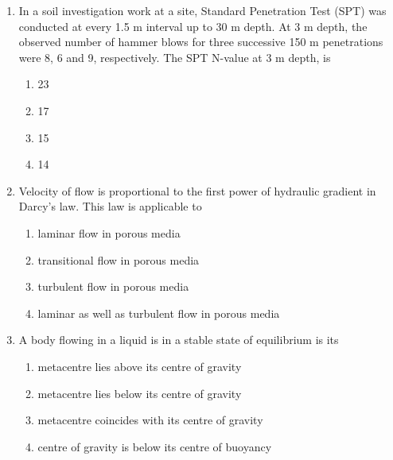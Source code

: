 \documentclass[journal]{IEEEtran}
\begin{document}
\begin{enumerate}
\item In a soil investigation work at a site, Standard Penetration Test (SPT) was conducted at every 1.5 m  interval up to 30 m depth. At 3 m depth, the observed number of hammer blows for three successive 150 m penetrations were 8, 6 and 9, respectively. The SPT N-value at 3 m depth, is
\begin{multicols}{2}
    \begin{enumerate}
        \item 23
        \item 17
        \item 15
        \item 14
    \end{enumerate}
\end{multicols}

\item Velocity of flow is proportional to the first power of hydraulic gradient in Darcy's law. This law is applicable to
\begin{multicols}{2}
    \begin{enumerate}
        \item laminar flow in porous media
        \item transitional flow in porous media
        \item turbulent flow in porous media
        \item laminar as well as turbulent flow in porous media
    \end{enumerate}
\end{multicols}

\item A body flowing in a liquid is in a stable state of equilibrium is its
\begin{multicols}{2}
    \begin{enumerate}
        \item metacentre lies above its centre of gravity
        \item metacentre lies below its centre of gravity
        \item metacentre coincides with its centre of gravity
        \item centre of gravity is below its centre of buoyancy
    \end{enumerate}
\end{multicols}


\end{enumerate}
\end{document}
